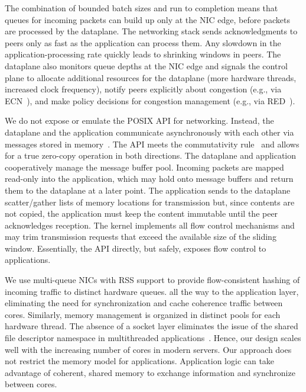 The combination of bounded batch sizes and run to completion means that
queues for incoming packets can build up only at the NIC edge, before
packets are processed by the dataplane.  The networking stack sends
acknowledgments to peers only as fast as the application can process
them. Any slowdown in the application-processing rate quickly leads to
shrinking windows in peers. The dataplane also monitors queue depths
at the NIC edge and signals the control plane to allocate additional
resources for the dataplane (more hardware threads, increased clock
frequency), notify peers explicitly about congestion (e.g., via
ECN~\cite{ramakrishnan2001addition}), and make policy decisions for
congestion management (e.g., via
RED~\cite{DBLP:journals/ton/FloydJ93}).



 We do
not expose or emulate the POSIX API for networking.  Instead, the
dataplane and the application communicate asynchronously with each
other via messages stored in
memory~\cite{DBLP:conf/osdi/HanMCR12,DBLP:journals/cacm/Rizzo12}.  The API meets the
commutativity rule~\cite{DBLP:conf/sosp/ClementsKZMK13} and allows for
a true zero-copy operation in both directions. The dataplane and
application cooperatively manage the message buffer pool. Incoming
packets are mapped read-only into the application, which may hold onto
message buffers and return them to the dataplane at a later point.
The application sends to the dataplane scatter/gather lists of memory
locations for transmission but, since contents are not copied, the
application must keep the content immutable until the peer
acknowledges reception. The kernel implements all flow control
mechanisms and may trim transmission requests that exceed the
available size of the sliding window.  Essentially, the API directly,
but safely, exposes flow control to applications.


 We use
multi-queue NICs with RSS support to provide flow-consistent hashing
of incoming traffic to distinct hardware queues.  all the way to the application layer,
eliminating the need for synchronization and cache coherence traffic
between cores. Similarly, memory management is organized in distinct
pools for each hardware thread. The absence of a socket layer
eliminates the issue of the shared file descriptor namespace in
multithreaded
applications~\cite{DBLP:conf/sosp/ClementsKZMK13}. Hence, our design
scales well with the increasing number of cores in modern servers. Our
approach does not restrict the memory model for
applications. Application logic can take advantage of coherent, shared
memory to exchange information and synchronize between cores.




